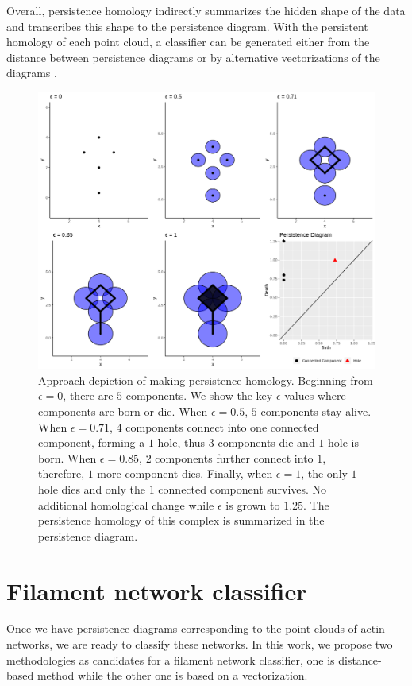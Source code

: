 \documentclass[10pt]{article}
\begin{document}
Overall, persistence homology indirectly summarizes the hidden shape of the data and transcribes this shape to the persistence diagram. With the persistent homology of each point cloud, a classifier can be generated either from the distance \cite{marchese2018signal} between persistence diagrams or by alternative vectorizations of the diagrams \cite{adams2017persistence,bubenik2015statistical,maroulas2018stable}.

\begin{figure}[!htbp]
	\begin{center}
		\includegraphics[width=1\textwidth]{pd_example.png}
	\end{center}
	\caption{Approach depiction of making persistence homology. Beginning from $\epsilon=0$, there are $5$ components. We show the key $\epsilon$ values where components are born or die. When $\epsilon=0.5$, $5$ components stay alive. When $\epsilon=0.71$, $4$ components connect into one connected component, forming a $1$ hole, thus $3$ components die and $1$ hole is born. When $\epsilon=0.85$, $2$ components further connect into $1$, therefore, $1$ more component dies. Finally, when $\epsilon=1$, the only $1$ hole dies and only the $1$ connected component survives. No additional homological change while $\epsilon$ is grown to $1.25$. The persistence homology of this complex is summarized in the persistence diagram.}
	\label{fig:persistencediagram}
\end{figure}

\section{Filament network classifier}
Once we have persistence diagrams corresponding to the point clouds of actin networks, we are ready to classify these networks. In this work, we propose two methodologies as candidates for a filament network classifier, one is distance-based method while the other one is based on a vectorization.
\end{document}

